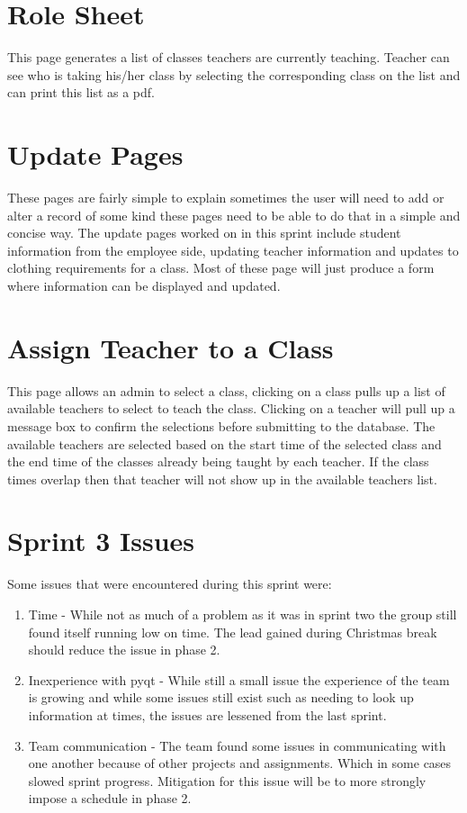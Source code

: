 \documentclass{book}
\begin{document}
\section{Role Sheet}
This page generates a list of classes teachers are currently teaching. Teacher can see who is taking his/her class by selecting the corresponding class on the list and can print this list as a pdf. 

\section{Update Pages}
These pages are fairly simple to explain sometimes the user will need to add or alter a record of some kind these pages need to be able to do that in a simple and concise way. The update pages worked on in this sprint include student information from the employee side, updating teacher information and updates to clothing requirements for a class. Most of these page will just produce a form where information can be displayed and updated.

\section{Assign Teacher to a Class}
This page allows an admin to select a class, clicking on a class pulls up a list of available teachers to select to teach the class. Clicking on a teacher will pull up a message box to confirm the selections before submitting to the database. The available teachers are selected based on the start time of the selected class and the end time of the classes already being taught by each teacher. If the class times overlap then that teacher will not show up in the available teachers list.

\section{Sprint 3 Issues}
Some issues that were encountered during this sprint were:

\begin{enumerate}
\item Time - While not as much of a problem as it was in sprint two the group still found itself running low on time. The lead gained during Christmas break should reduce the issue in phase 2.
\item Inexperience with pyqt - While still a small issue the experience of the team is growing and while some issues still exist such as needing to look up information at times, the issues are lessened from the last sprint.
\item Team communication - The team found some issues in communicating with one another because of other projects and assignments. Which in some cases slowed sprint progress. Mitigation for this issue will be to more strongly impose a schedule in phase 2.
\end{enumerate}
\end{document}
